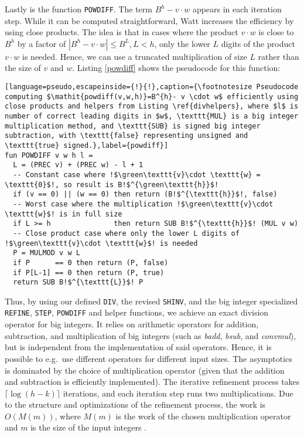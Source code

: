 Lastly is the function \texttt{POWDIFF}. The term $B^h-v \cdot w$ appears in each
iteration step. While it can be computed straightforward, Watt increases the
efficiency by using close products. The idea is that in cases where the product
$v\cdot w$ is close to $B^h$ by a factor of $|B^h- v\cdot w|\leq B^L, L < h$, only the
lower $L$ digits of the product $v \cdot w$ is needed. Hence, we can use a truncated
multiplication of size $L$ rather than the size of $v$ and $w$. Listing
\ref{powdiff} shows the pseudocode for this function:
\begin{lstlisting}[language=pseudo,escapeinside={!}{!},caption={\footnotesize Pseudocode computing $\mathit{powdiff(v,w,h)}=B^{h}- v \cdot w$ efficiently using close products and helpers from Listing \ref{divhelpers}, where $l$ is number of correct leading digits in $w$, \texttt{MUL} is a big integer multiplication method, and \texttt{SUB} is signed big integer subtraction, with \texttt{false} representing unsigned and \texttt{true} signed.},label={powdiff}]
fun POWDIFF v w h l =
  L = (PREC v) + (PREC w) - l + 1
  -- Constant case where !$\green\texttt{v}\cdot \texttt{w} = \texttt{0}$!, so result is B!$^{\green\texttt{h}}$!
  if (v == 0) || (w == 0) then return (B!$^{\texttt{h}}$!, false)
  -- Worst case where the multiplication !$\green\texttt{v}\cdot \texttt{w}$! is in full size
  if L >= h               then return SUB B!$^{\texttt{h}}$! (MUL v w)
  -- Close product case where only the lower L digits of !$\green\texttt{v}\cdot \texttt{w}$! is needed
  P = MULMOD v w L
  if P      == 0 then return (P, false)
  if P[L-1] == 0 then return (P, true)
  return SUB B!$^{\texttt{L}}$! P
\end{lstlisting}

Thus, by using our defined \texttt{DIV}, the revised \texttt{SHINV}, and the big
integer specialized \texttt{REFINE}, \texttt{STEP}, \texttt{POWDIFF} and helper
functions, we achieve an exact division operator for big integers. It relies on
arithmetic operators for addition, subtraction, and multiplication of big
integers (such as \textit{badd}, \textit{bsub}, and \textit{convmul}), but is
independent from the implementation of said operators. Hence, it is possible to
e.g.\ use different operators for different input sizes. The asymptotics is
dominated by the choice of multiplication operator (given that the addition and
subtraction is efficiently implemented). The iterative refinement process takes
$\lceil \log (h-k) \rceil$ iterations, and each iteration step runs two
multiplications. Due to the structure and optimizations of the refinement
process, the work is $O(M(m))$, where $M(m)$ is the work of the chosen
multiplication operator and $m$ is the size of the input integers
\cite{watt2023efficient}.




